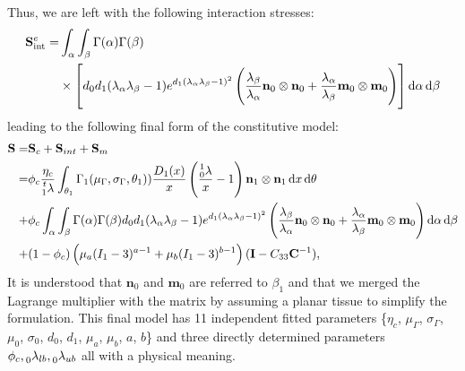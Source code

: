    Thus, we are left with the following interaction stresses:
        \begin{equation}\label{c3:eqn:52}
        \begin{aligned}
        \mathbf{S}_\mathrm{int}^e =& \int_\alpha\int_\beta \Gamma(\alpha)\Gamma(\beta) \\
        &\times\left[d_0d_1(\lambda_\alpha\lambda_\beta-1)e^{d_1(\lambda_\alpha\lambda_\beta-1)^2}\left(\frac{\lambda_\beta}{\lambda_\alpha}\mathbf{n}_0\otimes\mathbf{n}_0 + \frac{\lambda_\alpha}{\lambda_\beta}\mathbf{m}_0\otimes\mathbf{m}_0\right)\right]\dif\alpha\dif\beta
        \end{aligned}
        \end{equation}
    leading to the following final form of the constitutive model:
        \begin{equation}\label{c3:eqn:53}
        \begin{aligned}
        \mathbf{S} =& \mathbf{S}_c + \mathbf{S}_{int} + \mathbf{S}_m  \\
        =& \phi_c\frac{\eta_c}{\prescript{t}{1}{\lambda}} \int_{\theta_1} \Gamma_1(\mu_\Gamma, \sigma_\Gamma,\theta_1))
        \frac{D_1(x)}{x}\left(\frac{\prescript{1}{0}{\lambda}}{x} - 1\right)\mathbf{n}_1\otimes\mathbf{n}_1 \dif x \dif \theta \\
        +& \phi_c\int_\alpha\int_\beta \Gamma(\alpha)\Gamma(\beta) d_0d_1(\lambda_\alpha\lambda_\beta-1)e^{d_1(\lambda_\alpha\lambda_\beta-1)^2}\left(\frac{\lambda_\beta}{\lambda_\alpha}\mathbf{n}_0\otimes\mathbf{n}_0 + \frac{\lambda_\alpha}{\lambda_\beta}\mathbf{m}_0\otimes\mathbf{m}_0\right)\dif\alpha\dif\beta    \\
        +&(1-\phi_c) \left(\mu_a(I_1 - 3)^{a-1} + \mu_b(I_1 - 3)^{b-1}\right)(\mathbf{I} - C_{33}\mathbf{C}^{-1}), \\
        \end{aligned}
        \end{equation}
        It is understood that $\mathbf{n}_0$ and $\mathbf{m}_0$ are referred to $\beta_1$ and that we merged the Lagrange multiplier with the matrix by assuming a planar tissue to simplify the formulation. This final model has 11 independent fitted parameters \{$\eta_c$, $\mu_\Gamma$, $\sigma_\Gamma$, $\mu_0$, $\sigma_0$, $d_0$, $d_1$, $\mu_a$, $\mu_b$, $a$, $b$\} and three directly determined parameters $\phi_c, \prescript{}{0}{\lambda}_{lb}, \prescript{}{0}{\lambda}_{ub}$ all with a physical meaning.
        
